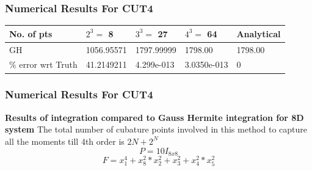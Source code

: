 \documentclass{beamer}
\begin{document}
\begin{frame}
\frametitle{Numerical Results For CUT4}
\footnotesize
\begin{center}
  \begin{tabular}{ | l | l | l | l | l | }
    \hline
       No. of pts 					& $2^3=$ 8 							& $3^3=$ 27 			  & $4^3=$ 64			 & Analytical       \\ \hline 
      GH          					&   1056.95571  			  & 1797.99999      & 1798.00     	 &   1798.00           \\ \hline
\% error wrt Truth       	  &   41.2149211    			&  4.299e-013  	  	& 3.0350e-013   &   0         \\ 
      \hline
  \end{tabular}
\end{center} 
\end{frame}
\begin{frame}
\frametitle{Numerical Results For CUT4}
{\bf Results of integration compared to Gauss Hermite integration for 8D system}\newline
The total number of cubature points involved in this method to capture all the moments till 4th order is $2N+2^N$
\begin{equation*}
P=10I_{8x8}
\end{equation*}
\begin{equation*}
F=x_1^4+x_8^2*x_2^2+x_3^2+x_4^2*x_5^2
\end{equation*}
\end{frame}
\end{document}
